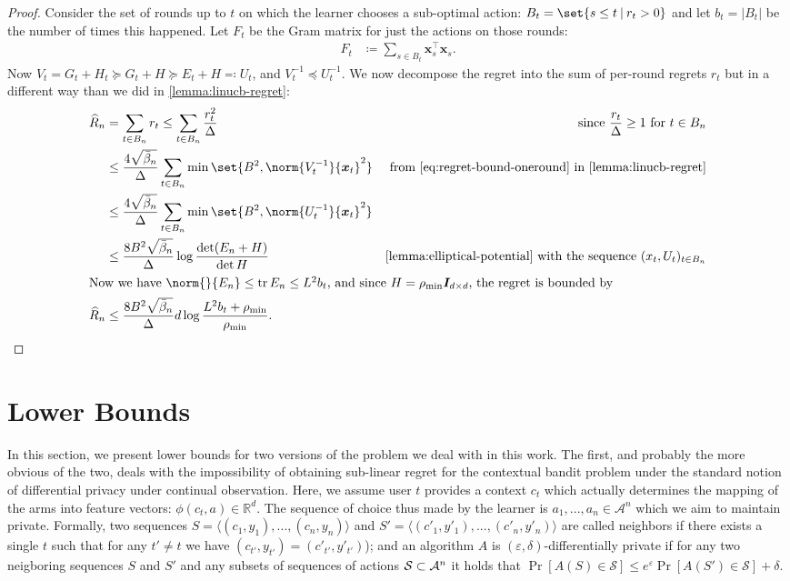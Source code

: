 \documentclass{article}
\renewcommand{\vec}[1]{\bm{#1}}
\newcommand{\defeq}{\coloneq}
\newcommand{\eqdef}{\eqcolon}
\newcommand{\inv}[1]{#1^{-1}}
\newcommand{\Real}{\mathds{R}}
\DeclareMathOperator{\tr}{tr}
\newcommand\given[1][\delimsize]{%
  \providecommand{\delimsize}{}
  \nonscript\:#1\vert\allowbreak\nonscript\:\mathopen{}
}
\providecommand\transp{\top}
\let\transpsymbol\transp
\renewcommand{\transp}[1]{#1^\transpsymbol}
\newcommand{\Aset}[1]{\mathcal{A}_{#1}}
\newcommand{\Eye}[1]{\bm{I}_{#1 \times #1}}
\newcommand{\XtX}[1]{\transp{#1}{#1}}
\begin{document}
\begin{proof}
  Consider the set of rounds up to $t$ on which the learner chooses a
  sub-optimal action: $B_t = \set{s \le t \given r_t > 0}$ and let
  $b_t = |B_t|$ be the number of times this happened.  Let $F_t$ be
  the Gram matrix for just the actions on those rounds:
  \begin{align*}
    F_t &\defeq \sum_{s\in B_t} \XtX{\vec x_s}.
  \end{align*}
  Now $V_t = G_t + H_t \succeq G_t + H \succeq E_t + H \eqdef U_t$, and
  $\inv{V_t} \preceq \inv{U_t}$.  We now decompose the regret into the
  sum of per-round regrets $r_t$ but in a different way than we did in
  \cref{lemma:linucb-regret}:
  \begin{align*}
    \widehat R_n
    &= \sum_{t\in B_n} r_t \le \sum_{t\in B_n} \frac{r_t^2}{\Delta}
    &\text{since } \frac{r_t}{\Delta} \ge 1 \text{ for } t\in B_n \\
    &\le \frac{4\sqrt{\bar\beta_n}}{\Delta} \sum_{t\in B_n} \min\set{B^2, \norm{\inv{V_t}}{\vec x_t}^2}
    &\text{from \eqref{eq:regret-bound-oneround} in \cref{lemma:linucb-regret}} \\
    &\le \frac{4\sqrt{\bar\beta_n}}{\Delta} \sum_{t\in B_n} \min\set{B^2, \norm{\inv{U_t}}{\vec x_t}^2} \\
    &\le \frac{8B^2\sqrt{\bar\beta_n}}{\Delta} \log\frac{\det(E_n+H)}{\det H}
    &\text{\Cref{lemma:elliptical-potential} with the sequence } (x_t, U_t)_{t\in B_n} \\
    \intertext{Now we have $\norm{}{E_n} \le \tr E_n \le L^2b_t$, and since $H =
    \rho_{\min}\Eye{d}$, the regret is bounded by}
    \widehat R_n &\le \frac{8B^2\sqrt{\bar\beta_n}}{\Delta} d\log\frac{L^2b_t + \rho_{\min}}{\rho_{\min}}.
  \end{align*}

\end{proof}


\section{Lower Bounds}
\label{sec:lower_bounds}

In this section, we present lower bounds for two versions of the problem we deal with in this work. The first, and probably the more obvious of the two, deals with the impossibility of obtaining sub-linear regret for the contextual bandit problem under the standard notion of differential privacy under continual observation. Here, we assume user $t$ provides a context $c_t$ which actually determines the mapping of the arms into feature vectors: $\phi(c_t, a) \in \Real^d$. The sequence of choice thus made by the learner is $a_1,..., a_n \in \Aset{}^n$ which we aim to maintain private. Formally, two sequences $S = \langle (c_1, y_1),..., (c_n,y_n)\rangle$ and $S' = \langle (c'_1, y'_1),..., (c'_n,y'_n)\rangle$ are called neighbors if there exists a single $t$ such that for any $t'\neq t$ we have $(c_{t'},y_{t'}) = (c'_{t'},y'_{t'})$); and an algorithm $A$ is $(\varepsilon,\delta)$-differentially private if for any two neigboring sequences $S$ and $S'$ and any subsets of sequences of actions ${\cal S}\subset \Aset{}^n$ it holds that $\Pr[A(S)\in\mathcal{S}] \leq e^\varepsilon \Pr[A(S')\in \mathcal{S}] +\delta$.
\end{document}
